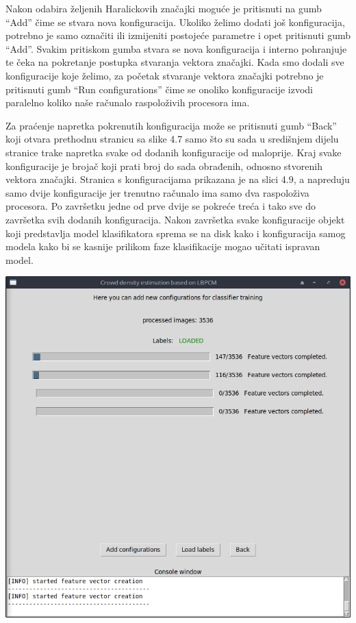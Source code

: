\documentclass[times, utf8, zavrsni, numeric]{fer}
\begin{document}
\bigbreak

Nakon odabira željenih Haralickovih
značajki moguće je pritisnuti na gumb \enquote{Add} čime se stvara
nova konfiguracija. Ukoliko želimo dodati još konfiguracija, potrebno je samo
označiti ili izmijeniti postojeće parametre i opet pritisnuti gumb \enquote{Add}.
Svakim pritiskom gumba stvara se nova konfiguracija i interno pohranjuje te čeka na
pokretanje postupka stvaranja vektora značajki. Kada smo dodali sve konfiguracije
koje želimo, za početak stvaranje vektora značajki potrebno je pritisnuti gumb
\enquote{Run configurations} čime se onoliko konfiguracije izvodi paralelno koliko
naše računalo raspoloživih procesora ima. 

\bigbreak

Za praćenje napretka pokrenutih konfiguracija može se pritisnuti gumb 
\enquote{Back} koji otvara prethodnu stranicu sa slike 4.7 samo što su sada
u središnjem dijelu stranice trake napretka svake od dodanih konfiguracije od maloprije. 
Kraj svake konfiguracije je brojač koji prati broj do sada obrađenih, odnosno
stvorenih vektora značajki. Stranica s konfiguracijama prikazana je na slici 4.9, a 
napreduju samo dvije konfiguracije jer trenutno računalo ima samo dva raspoloživa procesora.
Po završetku jedne od prve dvije se pokreće treća i tako sve do završetka svih 
dodanih konfiguracija. Nakon završetka svake konfiguracije objekt koji predstavlja 
model klasifikatora sprema se na disk kako i konfiguracija samog modela kako
bi se kasnije prilikom faze klasifikacije mogao učitati ispravan model.

\begin{minipage}{\linewidth}
\centering
\includegraphics[scale=0.4]{img/fvc3.png}
\end{minipage}
\end{document}

